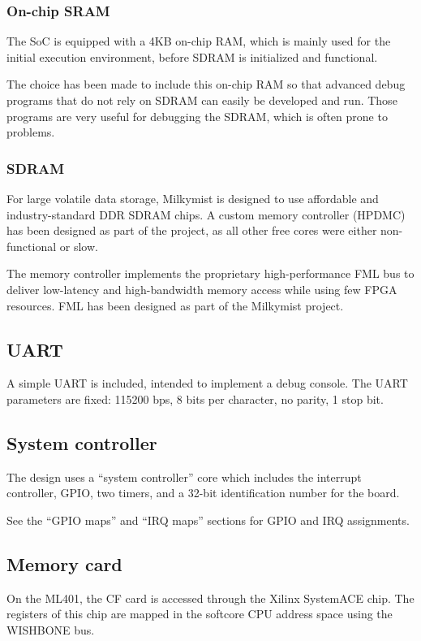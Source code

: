\documentclass[a4paper,11pt]{article}
\begin{document}
\subsubsection{On-chip SRAM}
The SoC is equipped with a 4KB on-chip RAM, which is mainly used for the initial execution environment, before SDRAM is initialized and functional.

The choice has been made to include this on-chip RAM so that advanced debug programs that do not rely on SDRAM can easily be developed and run. Those programs are very useful for debugging the SDRAM, which is often prone to problems.

\subsubsection{SDRAM}
For large volatile data storage, Milkymist is designed to use affordable and industry-standard DDR SDRAM chips. A custom memory controller (HPDMC) has been designed as part of the project, as all other free cores were either non-functional or slow.

The memory controller implements the proprietary high-performance FML bus to deliver low-latency and high-bandwidth memory access while using few FPGA resources. FML has been designed as part of the Milkymist project.

\subsection{UART}
A simple UART is included, intended to implement a debug console. The UART parameters are fixed: 115200 bps, 8 bits per character, no parity, 1 stop bit.

\subsection{System controller}
The design uses a ``system controller'' core which includes the interrupt controller, GPIO, two timers, and a 32-bit identification number for the board.

See the ``GPIO maps'' and ``IRQ maps'' sections for GPIO and IRQ assignments.

\subsection{Memory card}
On the ML401, the CF card is accessed through the Xilinx SystemACE chip. The registers of this chip are mapped in the softcore CPU address space using the WISHBONE bus.
\end{document}
